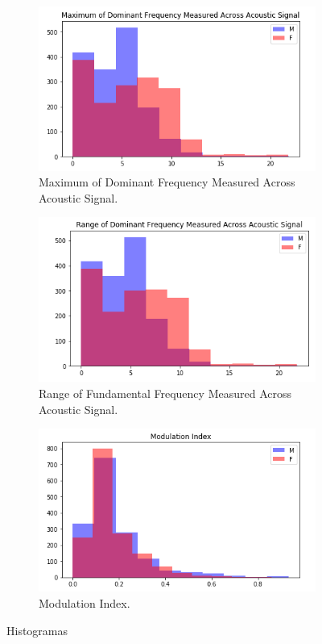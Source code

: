 \documentclass[12pt]{article}
\begin{document}
\begin{figure}[h!]
	\begin{subfigure}{0.49\linewidth}
		\centering
		\includegraphics[width=\linewidth]{images/hist_max_dfma.png}
		\caption{Maximum of Dominant Frequency Measured Across Acoustic Signal.}
		\label{fig:hist_max_dfma}
	\end{subfigure}
	\begin{subfigure}{0.49\linewidth}
		\centering
		\includegraphics[width=\linewidth]{images/hist_range_dfma.png}
		\caption{Range of Fundamental Frequency Measured Across Acoustic Signal.}
		\label{fig:hist_range_dfma}
	\end{subfigure}
	\hfill
	\begin{subfigure}{0.49\linewidth}
		\centering
		\includegraphics[width=\linewidth]{images/hist_mi.png}
		\caption{Modulation Index.}
		\label{fig:hist_mi}
	\end{subfigure}
	\caption{Histogramas}
\end{figure}
\end{document}
